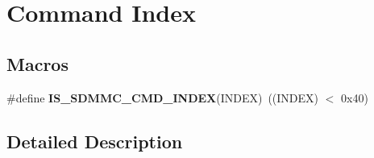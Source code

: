 \hypertarget{group___s_d_m_m_c___l_l___command___index}{}\section{Command Index}
\label{group___s_d_m_m_c___l_l___command___index}
\subsection*{Macros}
\begin{DoxyCompactItemize}
\item 
\mbox{\label{group___s_d_m_m_c___l_l___command___index_ga6eb9616e061f8bf8e3d5864e46d44067}} 
\#define {\bfseries I\+S\+\_\+\+S\+D\+M\+M\+C\+\_\+\+C\+M\+D\+\_\+\+I\+N\+D\+EX}(I\+N\+D\+EX)~((I\+N\+D\+EX) $<$ 0x40)
\end{DoxyCompactItemize}


\subsection{Detailed Description}
